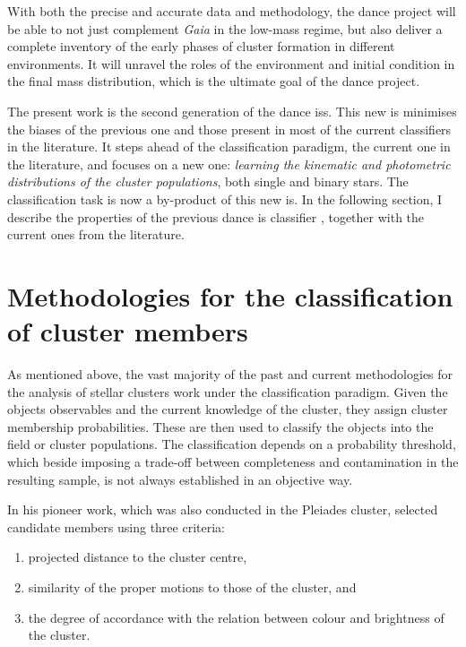With both the precise and accurate data and methodology, the \gls{dance} project will be able to not just complement \emph{Gaia} in the low-mass regime, but also deliver a complete inventory of the early phases of cluster formation in different environments. It will unravel the roles of the environment and initial condition in the final mass distribution, which is the ultimate goal of the \gls{dance} project.

The present work is the second generation of the \gls{dance} \glspl{is}. This new \gls{is} minimises the biases of the previous one and those present in most of the current classifiers in the literature. It steps ahead of the classification paradigm, the current one in the literature, and focuses on a new one: \textit{learning the kinematic and photometric distributions of the cluster populations}, both single and binary stars. The classification task is now a by-product of this new \gls{is}. In the following section, I describe the properties of the previous \gls{dance} \gls{is} classifier \cite[the one from][]{Sarro2014}, together with the current ones from the literature.    

\section{Methodologies for the classification of cluster members}
\label{sect:current_methodologies}

As mentioned above, the vast majority of the past and current methodologies for the analysis of stellar clusters work under the classification paradigm. Given the objects observables and the current knowledge of the cluster, they assign cluster membership probabilities. These are then used to classify the objects into the field or cluster populations. The classification depends on a probability threshold, which beside imposing a trade-off between completeness and contamination in the resulting sample, is not always established in an objective way.  

In his pioneer work, which was also conducted in the Pleiades cluster, \citet{Trumpler1921} selected candidate members using three criteria: 
\begin{enumerate}
\item projected distance to the cluster centre,
\item similarity of the proper motions to those of the cluster, and
\item the degree of accordance with the relation between colour and brightness of the cluster. 
\end{enumerate}

